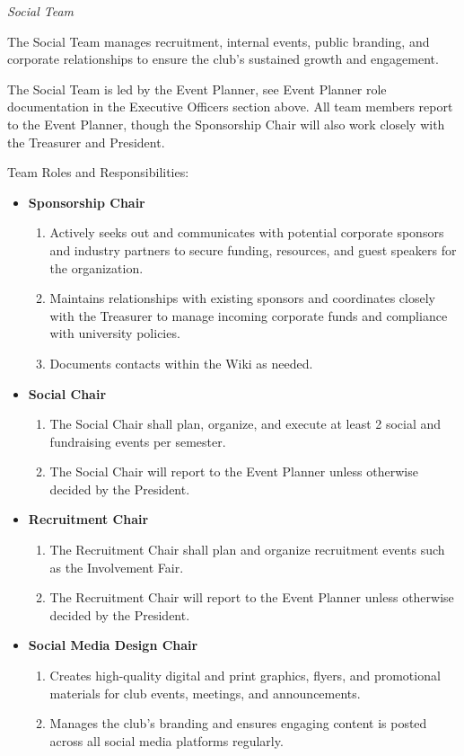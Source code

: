 \documentclass[12pt]{article}
\begin{document}
\textit{Social Team}

The Social Team manages recruitment, internal events, public branding, and corporate relationships to ensure the club's sustained growth and engagement.

The Social Team is led by the Event Planner, see Event Planner role documentation in the Executive Officers section above. All team members report to the Event Planner, though the Sponsorship Chair will also work closely with the Treasurer and President.

Team Roles and Responsibilities:
\begin{itemize}
  \item \textbf{Sponsorship Chair}
  \begin{enumerate}
    \item Actively seeks out and communicates with potential corporate sponsors and industry partners to secure funding, resources, and guest speakers for the organization.
    \item Maintains relationships with existing sponsors and coordinates closely with the Treasurer to manage incoming corporate funds and compliance with university policies.
    \item Documents contacts within the Wiki as needed.
  \end{enumerate}
  \item \textbf{Social Chair}
  \begin{enumerate}
    \item The Social Chair shall plan, organize, and execute at least 2 social and fundraising events per semester.
    \item The Social Chair will report to the Event Planner unless otherwise decided by the President.
  \end{enumerate}
  \item \textbf{Recruitment Chair}
  \begin{enumerate}
    \item The Recruitment Chair shall plan and organize recruitment events such as the Involvement Fair.
    \item The Recruitment Chair will report to the Event Planner unless otherwise decided by the President.
  \end{enumerate}
  \item \textbf{Social Media Design Chair}
  \begin{enumerate}
    \item Creates high-quality digital and print graphics, flyers, and promotional materials for club events, meetings, and announcements.
    \item Manages the club's branding and ensures engaging content is posted across all social media platforms regularly.
  \end{enumerate}
\end{itemize}
\end{document}
